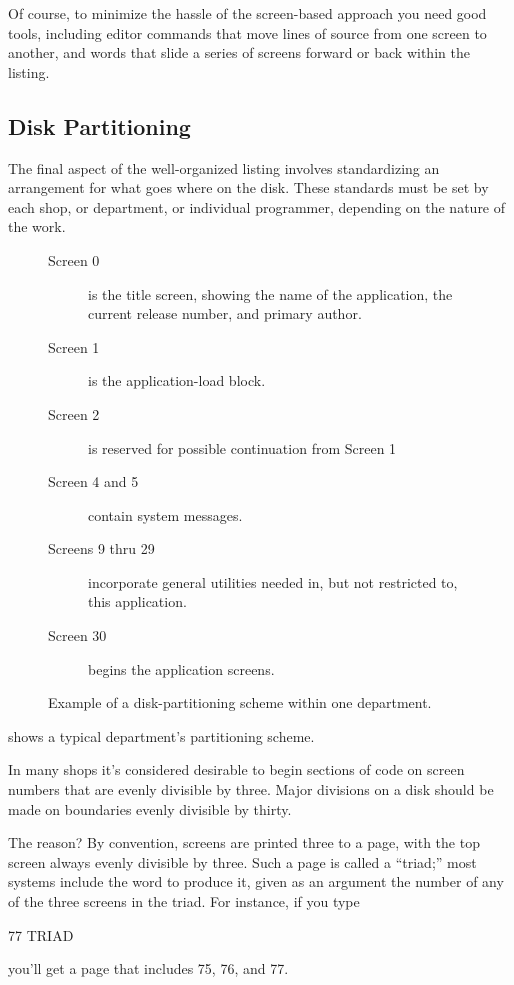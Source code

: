 Of course, to minimize the hassle of the screen-based approach you
need good tools, including editor commands that move lines of source
from one screen to another, and words that slide a series of screens
forward or back within the listing.%

\subsection{Disk Partitioning}%
The final aspect of the well-organized listing involves standardizing
an arrangement for what goes where on the disk.  These standards must
be set by each shop, or department, or individual programmer,
depending on the nature of the work.

\begin{figure*}
\caption{Example of a disk-partitioning scheme within one department.}

\begin{description}
\item[Screen 0] is the title screen, showing the name of the
    application, the current release number, and primary author.
\item[Screen 1] is the application-load block.
\item[Screen 2] is reserved for possible continuation from Screen 1
\item[Screen 4 and 5] contain system messages.
\item[Screens 9 thru 29] incorporate general utilities needed
    in, but not restricted to, this application.
\item[Screen 30] begins the application screens.
\end{description}
\end{figure*}

 shows a typical department's partitioning scheme.

In many \Forth{} shops it's considered desirable to begin sections of
code on screen numbers that are evenly divisible by three.  Major
divisions on a disk should be made on boundaries evenly divisible by
thirty.%

The reason? By convention, \Forth{} screens are printed three to a
page, with the top screen always evenly divisible by three.  Such a
page is called a ``triad;'' most \Forth{} systems include the word
 to produce it, given as an argument the number of any of
the three screens in the triad.  For instance, if you type
\begin{Code}
77 TRIAD
\end{Code}
you'll get a page that includes 75, 76, and 77.

